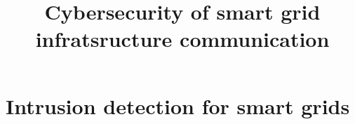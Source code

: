 \documentclass{masterthesis-uc2-en}
\title{Cybersecurity of smart grid infratsructure communication}
\begin{document}
\frontmatter
	\maketitlepage
	\pagestyle{plain}
	
	\hypersetup{citecolor=blue}

	
	

\mainmatter
	\pagestyle{fancy}



	\chapter{Intrusion detection for smart grids}
	
	
\backmatter
	
	
\end{document}
